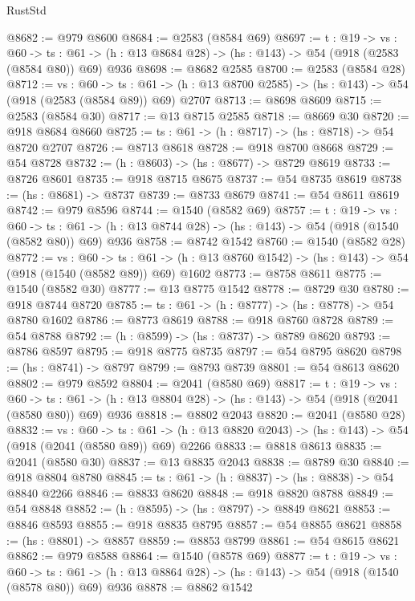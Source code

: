 \begin{lexlean}{RustStd}
\begin{coremodule}
@8682 := @979 @8600
@8684 := @2583 (@8584 @69)
@8697 := {t : @19} ->
  {vs : @60} ->
  {ts : @61} -> (h : @13 @8684 @28) -> (hs : @143) -> @54 (@918 (@2583 (@8584 @80)) @69) @936
@8698 := @8682 @2585
@8700 := @2583 (@8584 @28)
@8712 := {vs : @60} ->
  {ts : @61} -> (h : @13 @8700 @2585) -> (hs : @143) -> @54 (@918 (@2583 (@8584 @89)) @69) @2707
@8713 := @8698 @8609
@8715 := @2583 (@8584 @30)
@8717 := @13 @8715 @2585
@8718 := @8669 @30
@8720 := @918 @8684 @8660
@8725 := {ts : @61} -> (h : @8717) -> (hs : @8718) -> @54 @8720 @2707
@8726 := @8713 @8618
@8728 := @918 @8700 @8668
@8729 := @54 @8728
@8732 := (h : @8603) -> (hs : @8677) -> @8729 @8619
@8733 := @8726 @8601
@8735 := @918 @8715 @8675
@8737 := @54 @8735 @8619
@8738 := (hs : @8681) -> @8737
@8739 := @8733 @8679
@8741 := @54 @8611 @8619
@8742 := @979 @8596
@8744 := @1540 (@8582 @69)
@8757 := {t : @19} ->
  {vs : @60} ->
  {ts : @61} -> (h : @13 @8744 @28) -> (hs : @143) -> @54 (@918 (@1540 (@8582 @80)) @69) @936
@8758 := @8742 @1542
@8760 := @1540 (@8582 @28)
@8772 := {vs : @60} ->
  {ts : @61} -> (h : @13 @8760 @1542) -> (hs : @143) -> @54 (@918 (@1540 (@8582 @89)) @69) @1602
@8773 := @8758 @8611
@8775 := @1540 (@8582 @30)
@8777 := @13 @8775 @1542
@8778 := @8729 @30
@8780 := @918 @8744 @8720
@8785 := {ts : @61} -> (h : @8777) -> (hs : @8778) -> @54 @8780 @1602
@8786 := @8773 @8619
@8788 := @918 @8760 @8728
@8789 := @54 @8788
@8792 := (h : @8599) -> (hs : @8737) -> @8789 @8620
@8793 := @8786 @8597
@8795 := @918 @8775 @8735
@8797 := @54 @8795 @8620
@8798 := (hs : @8741) -> @8797
@8799 := @8793 @8739
@8801 := @54 @8613 @8620
@8802 := @979 @8592
@8804 := @2041 (@8580 @69)
@8817 := {t : @19} ->
  {vs : @60} ->
  {ts : @61} -> (h : @13 @8804 @28) -> (hs : @143) -> @54 (@918 (@2041 (@8580 @80)) @69) @936
@8818 := @8802 @2043
@8820 := @2041 (@8580 @28)
@8832 := {vs : @60} ->
  {ts : @61} -> (h : @13 @8820 @2043) -> (hs : @143) -> @54 (@918 (@2041 (@8580 @89)) @69) @2266
@8833 := @8818 @8613
@8835 := @2041 (@8580 @30)
@8837 := @13 @8835 @2043
@8838 := @8789 @30
@8840 := @918 @8804 @8780
@8845 := {ts : @61} -> (h : @8837) -> (hs : @8838) -> @54 @8840 @2266
@8846 := @8833 @8620
@8848 := @918 @8820 @8788
@8849 := @54 @8848
@8852 := (h : @8595) -> (hs : @8797) -> @8849 @8621
@8853 := @8846 @8593
@8855 := @918 @8835 @8795
@8857 := @54 @8855 @8621
@8858 := (hs : @8801) -> @8857
@8859 := @8853 @8799
@8861 := @54 @8615 @8621
@8862 := @979 @8588
@8864 := @1540 (@8578 @69)
@8877 := {t : @19} ->
  {vs : @60} ->
  {ts : @61} -> (h : @13 @8864 @28) -> (hs : @143) -> @54 (@918 (@1540 (@8578 @80)) @69) @936
@8878 := @8862 @1542

\end{coremodule}
\end{lexlean}
